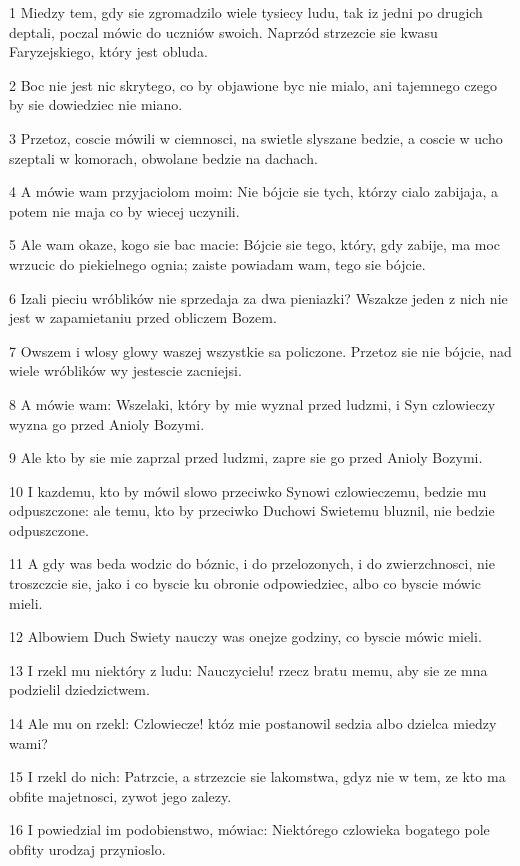 \par 1 Miedzy tem, gdy sie zgromadzilo wiele tysiecy ludu, tak iz jedni po drugich deptali, poczal mówic do uczniów swoich. Naprzód strzezcie sie kwasu Faryzejskiego, który jest obluda.
\par 2 Boc nie jest nic skrytego, co by objawione byc nie mialo, ani tajemnego czego by sie dowiedziec nie miano.
\par 3 Przetoz, coscie mówili w ciemnosci, na swietle slyszane bedzie, a coscie w ucho szeptali w komorach, obwolane bedzie na dachach.
\par 4 A mówie wam przyjaciolom moim: Nie bójcie sie tych, którzy cialo zabijaja, a potem nie maja co by wiecej uczynili.
\par 5 Ale wam okaze, kogo sie bac macie: Bójcie sie tego, który, gdy zabije, ma moc wrzucic do piekielnego ognia; zaiste powiadam wam, tego sie bójcie.
\par 6 Izali pieciu wróblików nie sprzedaja za dwa pieniazki? Wszakze jeden z nich nie jest w zapamietaniu przed obliczem Bozem.
\par 7 Owszem i wlosy glowy waszej wszystkie sa policzone. Przetoz sie nie bójcie, nad wiele wróblików wy jestescie zacniejsi.
\par 8 A mówie wam: Wszelaki, który by mie wyznal przed ludzmi, i Syn czlowieczy wyzna go przed Anioly Bozymi.
\par 9 Ale kto by sie mie zaprzal przed ludzmi, zapre sie go przed Anioly Bozymi.
\par 10 I kazdemu, kto by mówil slowo przeciwko Synowi czlowieczemu, bedzie mu odpuszczone: ale temu, kto by przeciwko Duchowi Swietemu bluznil, nie bedzie odpuszczone.
\par 11 A gdy was beda wodzic do bóznic, i do przelozonych, i do zwierzchnosci, nie troszczcie sie, jako i co byscie ku obronie odpowiedziec, albo co byscie mówic mieli.
\par 12 Albowiem Duch Swiety nauczy was onejze godziny, co byscie mówic mieli.
\par 13 I rzekl mu niektóry z ludu: Nauczycielu! rzecz bratu memu, aby sie ze mna podzielil dziedzictwem.
\par 14 Ale mu on rzekl: Czlowiecze! któz mie postanowil sedzia albo dzielca miedzy wami?
\par 15 I rzekl do nich: Patrzcie, a strzezcie sie lakomstwa, gdyz nie w tem, ze kto ma obfite majetnosci, zywot jego zalezy.
\par 16 I powiedzial im podobienstwo, mówiac: Niektórego czlowieka bogatego pole obfity urodzaj przynioslo.
